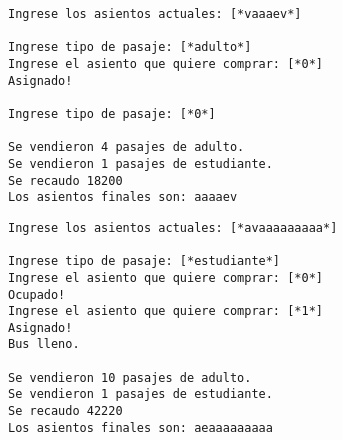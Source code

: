 \begin{lstlisting}[style=consola]
Ingrese los asientos actuales: [*vaaaev*]

Ingrese tipo de pasaje: [*adulto*]
Ingrese el asiento que quiere comprar: [*0*]
Asignado!

Ingrese tipo de pasaje: [*0*]

Se vendieron 4 pasajes de adulto.
Se vendieron 1 pasajes de estudiante.
Se recaudo 18200
Los asientos finales son: aaaaev
\end{lstlisting}


\begin{lstlisting}[style=consola]
Ingrese los asientos actuales: [*avaaaaaaaaa*]

Ingrese tipo de pasaje: [*estudiante*]
Ingrese el asiento que quiere comprar: [*0*]
Ocupado!
Ingrese el asiento que quiere comprar: [*1*]
Asignado!
Bus lleno.

Se vendieron 10 pasajes de adulto.
Se vendieron 1 pasajes de estudiante.
Se recaudo 42220
Los asientos finales son: aeaaaaaaaaa
\end{lstlisting}
